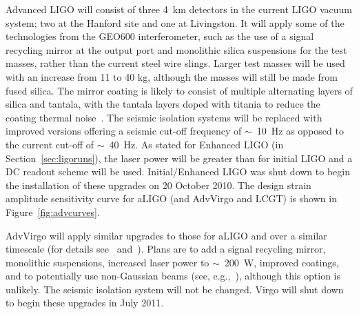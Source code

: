 Advanced LIGO will consist of three 4~km detectors in the current LIGO vacuum
system; two at the Hanford site and one at
Livingston. It will apply some of the technologies from the GEO600
interferometer, such as the use of a signal recycling mirror at the output port
and monolithic silica suspensions for the test masses, rather than the current
steel wire slings. Larger test masses will be used with an increase from 11 to
40 kg, although the masses will still be made from fused silica. The mirror
coating is likely to consist of multiple alternating layers of silica and
tantala, with the tantala layers doped with titania to reduce the coating
thermal noise~\cite{Agresti:2006}. The seismic isolation systems will be
replaced with improved versions offering a seismic cut-off frequency
of $\sim$~10~Hz as opposed to the current cut-off of $\sim$~40~Hz. As
stated for Enhanced LIGO (in Section~\ref{sec:ligoruns}), the laser
power will be greater than for initial LIGO and a DC readout scheme
will be used. Initial/Enhanced LIGO was shut down to begin the
installation of these upgrades on 20 October 2010. The design strain
amplitude sensitivity curve for aLIGO (and AdvVirgo and LCGT) is shown
in Figure~\ref{fig:advcurves}.

  
  
  AdvVirgo will apply similar upgrades to those for aLIGO and over a similar
timescale (for details see~\cite{AdvVirgoWhitepaper} and~\cite{AdvVirgoDesign}). Plans are
to add a signal recycling mirror, monolithic suspensions, increased laser power
to $\sim$~200~W, improved coatings, and to potentially use non-Gaussian beams (see,
e.g.,~\cite{Freise:2010}), although this option is unlikely. The seismic isolation
system will not be changed. Virgo will shut down to begin these upgrades in July
2011.


